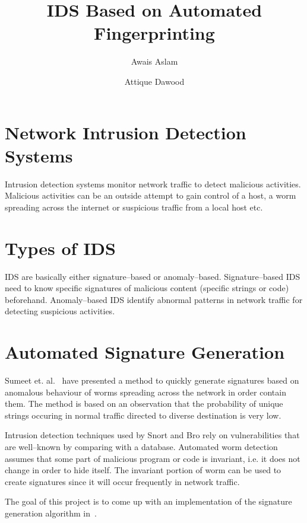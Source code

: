 \documentclass{article}
\begin{document}
\title{IDS Based on Automated Fingerprinting}
\author{Awais Aslam \and Attique Dawood}
\maketitle

\section{Network Intrusion Detection Systems}

Intrusion detection systems monitor network traffic to detect malicious activities. Malicious activities can be an outside attempt to gain control of a host, a worm spreading across the internet or suspicious traffic from a local host etc.

\section{Types of IDS}

IDS are basically either signature--based or anomaly--based. Signature--based IDS need to know specific signatures of malicious content (specific strings or code) beforehand. Anomaly--based IDS identify abnormal patterns in network traffic for detecting suspicious activities.

\section{Automated Signature Generation}

Sumeet et. al.~\cite{DBLP:conf/osdi/SinghEVS04} have presented a method to quickly generate signatures based on anomalous behaviour of worms spreading across the network in order contain them. The method is based on an observation that the probability of unique strings occuring in normal traffic directed to diverse destination is very low.

Intrusion detection techniques used by Snort and Bro rely on vulnerabilities that are well--known by comparing with a database. Automated worm detection assumes that some part of malicious program or code is invariant, i.e. it does not change in order to hide itself. The invariant portion of worm can be used to create signatures since it will occur frequently in network traffic.

The goal of this project is to come up with an implementation of the signature generation algorithm in~\cite{DBLP:conf/osdi/SinghEVS04}.

\nocite{*}

\end{document}
